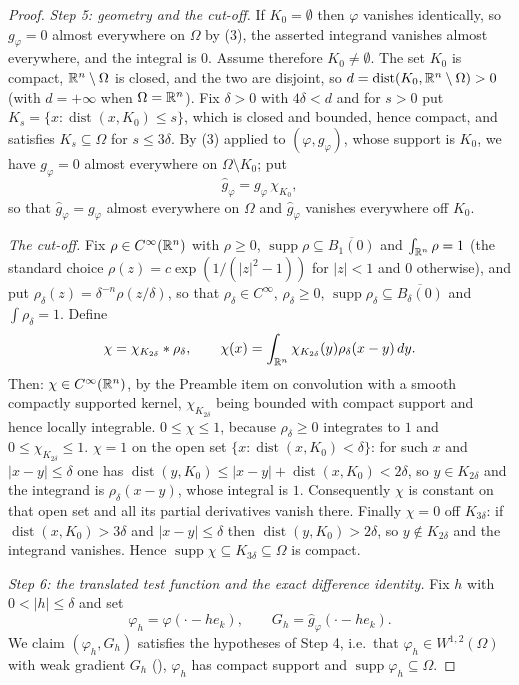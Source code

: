 \begin{proof}
\emph{Step 5: geometry and the cut-off.}  If $K_0=\emptyset$ then $\varphi$
vanishes identically, so $g_\varphi=0$ almost everywhere on $\Omega$ by (3),
the asserted integrand vanishes almost everywhere, and the integral is $0$.
Assume therefore $K_0\ne\emptyset$.  The set $K_0$ is compact,
$\mathbb{R}^n\setminus\Omega$ is closed, and the two are disjoint, so
$d=\operatorname{dist}(K_0,\mathbb{R}^n\setminus\Omega)>0$ (with $d=+\infty$ when
$\Omega=\mathbb{R}^n$).  Fix $\delta>0$ with $4\delta<d$ and for $s>0$ put
$K_s=\{x:\operatorname{dist}(x,K_0)\le s\}$, which is closed and bounded, hence
compact, and satisfies $K_s\subseteq\Omega$ for $s\le3\delta$.  By (3) applied
to $(\varphi,g_\varphi)$, whose support is $K_0$, we have $g_\varphi=0$ almost
everywhere on $\Omega\setminus K_0$; put
\[
\widehat g_\varphi=g_\varphi\,\chi_{K_0},
\]
so that $\widehat g_\varphi=g_\varphi$ almost everywhere on $\Omega$ and
$\widehat g_\varphi$ vanishes everywhere off $K_0$.

\emph{The cut-off.}  Fix
$\rho\in C^\infty(\mathbb{R}^n)$ with $\rho\ge0$,
$\operatorname{supp}\rho\subseteq\overline{B_1(0)}$ and $\int_{\mathbb{R}^n}\rho=1$ (the
standard choice $\rho(z)=c\exp(1/(|z|^2-1))$ for $|z|<1$ and $0$ otherwise), and
put $\rho_\delta(z)=\delta^{-n}\rho(z/\delta)$, so that $\rho_\delta\in
C^\infty$, $\rho_\delta\ge0$,
$\operatorname{supp}\rho_\delta\subseteq\overline{B_\delta(0)}$ and
$\int\rho_\delta=1$.  Define
\[
\chi=\chi_{K_{2\delta}}*\rho_\delta,
\qquad
\chi(x)=\int_{\mathbb{R}^n}\chi_{K_{2\delta}}(y)\rho_\delta(x-y)\,dy .
\]
Then: $\chi\in C^\infty(\mathbb{R}^n)$, by the Preamble item on convolution with a
smooth compactly supported kernel, $\chi_{K_{2\delta}}$ being bounded with
compact support and hence locally integrable.  $0\le\chi\le1$, because
$\rho_\delta\ge0$ integrates to $1$ and $0\le\chi_{K_{2\delta}}\le1$.
$\chi=1$ on the open set $\{x:\operatorname{dist}(x,K_0)<\delta\}$: for such
$x$ and $|x-y|\le\delta$ one has
$\operatorname{dist}(y,K_0)\le|x-y|+\operatorname{dist}(x,K_0)<2\delta$, so
$y\in K_{2\delta}$ and the integrand is $\rho_\delta(x-y)$, whose integral is
$1$.  Consequently $\chi$ is constant on that open set and all its partial
derivatives vanish there.  Finally $\chi=0$ off $K_{3\delta}$: if
$\operatorname{dist}(x,K_0)>3\delta$ and $|x-y|\le\delta$ then
$\operatorname{dist}(y,K_0)>2\delta$, so $y\notin K_{2\delta}$ and the
integrand vanishes.  Hence $\operatorname{supp}\chi\subseteq
K_{3\delta}\subseteq\Omega$ is compact.

\emph{Step 6: the translated test function and the exact difference identity.}
Fix $h$ with $0<|h|\le\delta$ and set
\[
\varphi_h=\varphi(\cdot-he_k),
\qquad
G_h=\widehat g_\varphi(\cdot-he_k).
\]
We claim $(\varphi_h,G_h)$ satisfies the hypotheses of Step 4, i.e.\ that
$\varphi_h\in W^{1,2}(\Omega)$ with weak gradient $G_h$
(), $\varphi_h$ has compact support and
$\operatorname{supp}\varphi_h\subseteq\Omega$.


\end{proof}
